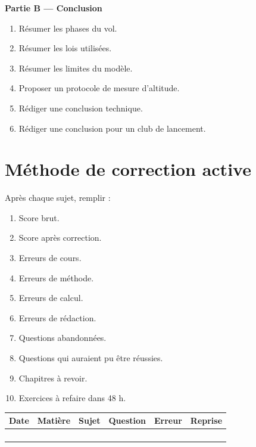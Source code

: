 \documentclass[11pt,a4paper]{article}
\begin{document}
\begin{difficile}
\textbf{Partie B — Conclusion}
\begin{enumerate}
  \item Résumer les phases du vol.
  \item Résumer les lois utilisées.
  \item Résumer les limites du modèle.
  \item Proposer un protocole de mesure d'altitude.
  \item Rédiger une conclusion technique.
  \item Rédiger une conclusion pour un club de lancement.
\end{enumerate}
\end{difficile}

\section{Méthode de correction active}

\begin{methode}
Après chaque sujet, remplir :
\begin{enumerate}
  \item Score brut.
  \item Score après correction.
  \item Erreurs de cours.
  \item Erreurs de méthode.
  \item Erreurs de calcul.
  \item Erreurs de rédaction.
  \item Questions abandonnées.
  \item Questions qui auraient pu être réussies.
  \item Chapitres à revoir.
  \item Exercices à refaire dans 48 h.
\end{enumerate}
\end{methode}

\begin{center}
\footnotesize
\begin{tabularx}{\textwidth}{|p{1.7cm}|p{2cm}|p{2.5cm}|p{2cm}|X|p{2cm}|}
\hline
Date & Matière & Sujet & Question & Erreur & Reprise\\
\hline
 & & & & & \\
\hline
 & & & & & \\
\hline
 & & & & & \\
\hline
 & & & & & \\
\hline
\end{tabularx}
\normalsize
\end{center}
\end{document}
